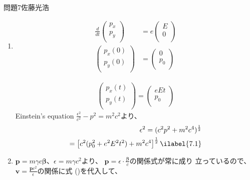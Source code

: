 \documentclass[fleqn]{jbook}
\begin{document}
\begin{answer}{問題7}{佐藤光浩}
\begin{enumerate}
    \item 
\begin{eqnarray}
 \frac{d}{dt}\left(\begin{array}{c}
 p_x \\ p_y \\ \end{array} \right)
 &= e \left(\begin{array}{c}
 E \\ 0 \\ \end{array} \right) \nonumber\\
 \left(\begin{array}{c}
 p_x(0) \\ p_y(0) \\ \end{array} \right)
 &= \left(\begin{array}{c} 
 0 \\ p_0 \\ \end{array} \right) 
\end{eqnarray}

\begin{eqnarray}
 \left(\begin{array}{c}
 p_x(t) \\ p_y(t) \\ \end{array} \right)
 = \left(\begin{array}{c}
  eEt \\ p_0 \\ \end{array} \right) 
\end{eqnarray}
Einstein's equation $\frac{\epsilon^2}{c^2} - p^2 =m^2 c^2$より、
\begin{eqnarray}
 \epsilon^2 = (c^2p^2 + m^2c^4)^{\frac{1}{2}} \\
 = \left[c^2 (p_0^2 + e^2E^2t^2) + m^2c^4\right]^{\frac{1}{2}} \ilabel{7.1}
\end{eqnarray}

    \item
$\mathbf{p} = m \gamma c \mathbf{\beta}$、$\epsilon = m \gamma c^2$より、
$\mathbf{p} = \epsilon \cdot \frac{\mathbf{\beta}}{c}$の関係式が常に成り
立っているので、$\mathbf{v} = \frac{\mathbf{p}c^2}{\epsilon}$の関係に式
()を代入して、


\end{enumerate}
\end{answer}
\end{document}
